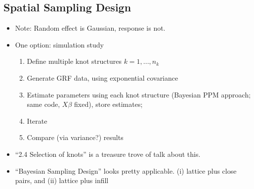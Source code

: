 \documentclass{article}
\begin{document}
\subsection*{Spatial Sampling Design}
\begin{itemize}
\item Note: Random effect is Gaussian, response is not.
\item One option: simulation study
  \begin{enumerate}
  \item Define multiple knot structures $k = 1,...,n_{k}$
  \item Generate GRF data, using exponential covariance
  \item Estimate parameters using each knot structure (Bayesian PPM approach; same code, $X\beta$ fixed), store estimates; 
  \item Iterate
  \item Compare (via variance?) results
  \end{enumerate}
\item ``2.4 Selection of knots'' \citep{Banerjee2008} is a treasure trove of talk about this.
\item ``Bayesian Sampling Design'' \citep{Diggle2006} looks pretty applicable. (i) lattice plus close pairs, and (ii) lattice plus infill
\end{itemize}
\end{document}
